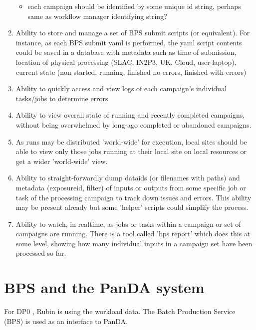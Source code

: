 \documentclass[DM,authoryear,toc]{lsstdoc}
\begin{document}
\begin{enumerate}
\begin{itemize}
	\item each campaign should be identified by some unique id string, 
	perhaps same as workflow manager identifying string?

	\end{itemize}

	\item Ability to store and manage a set of BPS submit scripts 
	(or equivalent).
	For instance, as each BPS submit yaml is performed, the yaml
	script contents could be saved in a database with metadata such
	as time of submission, location of physical processing
	(SLAC, IN2P3, UK, Cloud, user-laptop), current state (non started,
	running, finished-no-errors, finished-with-errors)


	\item Ability to quickly access and view logs of each 
	campaign's individual tasks/jobs to determine errors

	\item Ability to view overall state of running and recently
	completed campaigns, without being overwhelmed by long-ago completed
	or abandoned campaigns.

	\item As runs may be distributed 'world-wide' for execution,
	local sites should be able to view only those jobs running at
	their local site on local resources or get a wider 'world-wide' view.

	\item Ability to straight-forwardly dump dataids (or filenames
	with paths) and metadata (exposureid, filter) of inputs or outputs
	from some specific job or task of the processing campaign to
	track down issues and errors.  This ability may be present already
	but some 'helper' scripts could simplify the process.

	\item Ability to watch, in realtime, as jobs or tasks within
	a campaign or set of campaigns are running.  There is a tool	
	called 'bps report' which does this at some level, showing how
	many individual inputs in a campaign set have been processed
	so far.

	\end {enumerate}

\section{BPS and the PanDA system}

For DP0 \cite{RTN-013}, Rubin is using 
the \cite{PanDA} workload data.  The Batch Production 
Service (BPS) \cite{LDM-636} is used as an interface to PanDA.  
\end{document}
